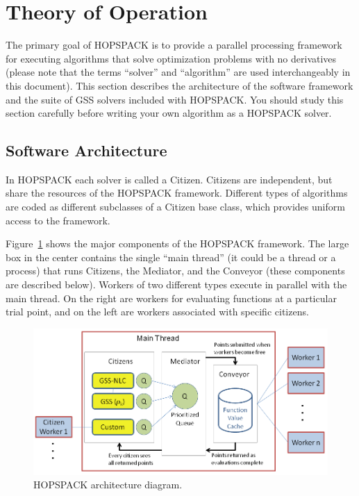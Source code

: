 \clearpage
\section{Theory of Operation}
\label{sec:thoperation}

The primary goal of HOPSPACK is to provide a parallel processing framework
for executing algorithms that solve optimization problems with no derivatives
(please note that the terms ``solver'' and ``algorithm'' are used
interchangeably in this document).
This section describes the architecture of the software framework and the
suite of GSS solvers included with HOPSPACK.  You should study this section
carefully before writing your own algorithm as a HOPSPACK solver.


\subsection{Software Architecture}
\label{subswoperation}

In HOPSPACK each solver is called a Citizen.  Citizens are independent,
but share the resources of the HOPSPACK framework.  Different types of algorithms
are coded as different subclasses of a Citizen base class, which provides
uniform access to the framework.

Figure~\ref{fig:block-diagram} shows the major components of the HOPSPACK
framework.  The large box in the center contains the single ``main thread''
(it could be a thread or a process)
that runs Citizens, the Mediator, and the Conveyor (these components are
described below).
Workers of two different types execute in parallel with the main thread.
On the right are workers for evaluating functions at a
particular trial point, and on the left are workers associated with
specific citizens.

\begin{figure}[!h]
  \centering
  \includegraphics[width=5.8in]{BlockDiagram.png}
  \vspace{-5mm}
  \caption{HOPSPACK architecture diagram.}
  \label{fig:block-diagram}
\end{figure}

